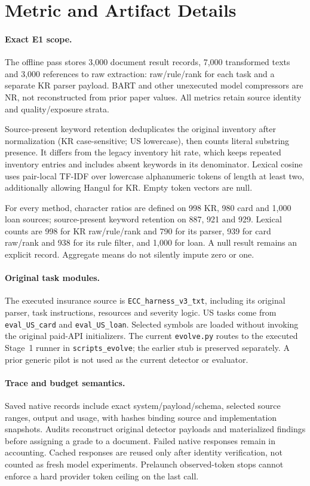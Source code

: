 \documentclass[11pt]{article}
\begin{document}

\clearpage
\appendix

\section{Metric and Artifact Details}
\label{sec:implementation}
\paragraph{Exact E1 scope.}
The offline pass stores 3,000 document result records, 7,000 transformed
texts and 3,000 references to raw extraction: raw/rule/rank for each task
and a separate KR parser payload. BART and other unexecuted model
compressors are NR, not reconstructed from prior paper values.
All metrics retain source identity and quality/exposure strata.

Source-present keyword retention deduplicates the original inventory
after normalization (KR case-sensitive; US lowercase), then counts
literal substring presence. It differs from the legacy inventory
hit rate, which keeps repeated inventory entries and includes absent
keywords in its denominator. Lexical cosine uses pair-local TF-IDF
over lowercase alphanumeric tokens of length at least two, additionally
allowing Hangul for KR. Empty token vectors are null.

For every method, character ratios are defined on 998 KR, 980 card and
1,000 loan sources; source-present keyword retention on 887, 921 and 929.
Lexical counts are 998 for KR raw/rule/rank and 790 for its parser,
939 for card raw/rank and 938 for its rule filter, and 1,000 for loan.
A null result remains an explicit record. Aggregate means do not
silently impute zero or one.

\paragraph{Original task modules.}
The executed insurance source is \texttt{ECC\_harness\_v3\_txt}, including
its original parser, task instructions, resources and severity logic.
US tasks come from \texttt{eval\_US\_card} and \texttt{eval\_US\_loan}.
Selected symbols are loaded without invoking the original paid-API
initializers. The current \texttt{evolve.py} routes to the executed
Stage~1 runner in \texttt{scripts\_evolve}; the earlier stub is preserved
separately. A prior generic pilot is not used as the current detector
or evaluator.

\paragraph{Trace and budget semantics.}
Saved native records include exact system/payload/schema, selected source
ranges, output and usage, with hashes binding source and implementation
snapshots. Audits reconstruct original detector payloads and materialized
findings before assigning a grade to a document. Failed native responses
remain in accounting. Cached responses are reused only after identity
verification, not counted as fresh model experiments.
Prelaunch observed-token stops cannot enforce a hard provider token ceiling
on the last call.
\end{document}
